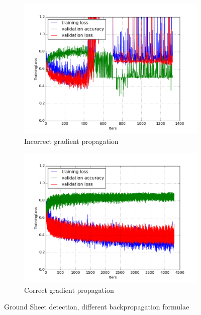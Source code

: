 \documentclass[a4paper,11pt]{article}
\begin{document}
\begin{figure}
    \centering
    \begin{minipage}[b]{\textwidth}
      \begin{subfigure}{.5\textwidth} 
        \centering
        \includegraphics[scale=0.4]{images/plot_ground_sheet_sbl_pcba.png}
        \caption{Incorrect gradient propagation}\label{fig:2a}
      \end{subfigure}%
      \begin{subfigure}{.5\textwidth} 
        \centering
        \includegraphics[scale=0.4]{images/plot_ground_sheet_sbl_pcba_all_backprop.png}
        \caption{Correct gradient propagation}\label{fig:2b}
      \end{subfigure} \par \vspace*{20pt} %
      \caption{Ground Sheet detection, different backpropagation formulae}\label{fig:2}
    \end{minipage}%
    \label{f52}
\end{figure}
\end{document}
